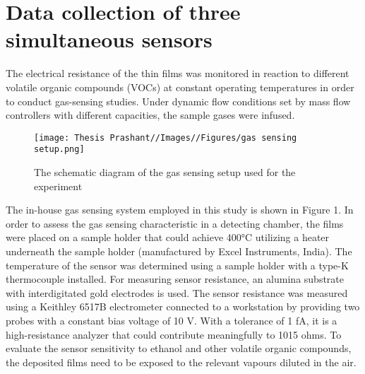 \chapter{Data collection of three simultaneous sensors}

The electrical resistance of the thin films was monitored in reaction to different volatile organic compounds (VOCs) at constant operating temperatures in order to conduct gas-sensing studies. Under dynamic flow conditions set by mass flow controllers with different capacities, the sample gases were infused. 
\begin{figure}
    \centering
    \texttt{[image: Thesis Prashant//Images//Figures/gas sensing setup.png]}
    \caption{ The schematic diagram of the gas sensing setup used for the experiment \cite{singh2024metal}}
    \label{fig:enter-label}
\end{figure}
The in-house gas sensing system employed in this study is shown in Figure 1. In order to assess the gas sensing characteristic in a detecting chamber, the films were placed on a sample holder that could achieve 400°C utilizing a heater underneath the sample holder (manufactured by Excel Instruments, India). The temperature of the sensor was determined using a sample holder with a type-K thermocouple installed. For measuring sensor resistance, an alumina substrate with interdigitated gold electrodes is used. The sensor resistance was measured using a Keithley 6517B electrometer connected to a workstation by providing two probes with a constant bias voltage of 10 V. With a tolerance of 1 fA, it is a high-resistance analyzer that could contribute meaningfully to  1015 ohms. To evaluate the sensor sensitivity to ethanol and other volatile organic compounds, the deposited films need to be exposed to the relevant vapours diluted in the air. \cite{singh2024metal}




